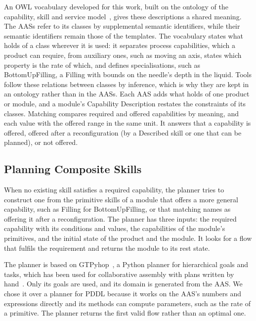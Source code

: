 \documentclass[5p,times,procedia]{elsarticle}
\begin{document}
An OWL vocabulary developed for this work, built on the ontology of the capability, skill and service model~\cite{koecher2023reference}, gives these descriptions a shared meaning. The AASs refer to its classes by supplemental semantic identifiers, while their semantic identifiers remain those of the templates. The vocabulary states what holds of a class wherever it is used: it separates process capabilities, which a product can require, from auxiliary ones, such as moving an axis, states which property is the rate of which, and defines specialisations, such as BottomUpFilling, a Filling with bounds on the needle's depth in the liquid. Tools follow these relations between classes by inference, which is why they are kept in an ontology rather than in the AASs. Each AAS adds what holds of one product or module, and a module's Capability Description restates the constraints of its classes. Matching compares required and offered capabilities by meaning, and each value with the offered range in the same unit. It answers that a capability is offered, offered after a reconfiguration (by a Described skill or one that can be planned), or not offered.

\subsection{Planning Composite Skills}
\label{sec:plan}

When no existing skill satisfies a required capability, the planner tries to construct one from the primitive skills of a module that offers a more general capability, such as Filling for BottomUpFilling, or that matching names as offering it after a reconfiguration. The planner has three inputs: the required capability with its conditions and values, the capabilities of the module's primitives, and the initial state of the product and the module. It looks for a flow that fulfils the requirement and returns the module to its rest state.

The planner is based on GTPyhop~\cite{nau2021gtpyhop}, a Python planner for hierarchical goals and tasks, which has been used for collaborative assembly with plans written by hand~\cite{belcamino2024modular}. Only its goals are used, and its domain is generated from the AAS. We chose it over a planner for PDDL because it works on the AAS's numbers and expressions directly and its methods can compute parameters, such as the rate of a primitive. The planner returns the first valid flow rather than an optimal one.
\end{document}
